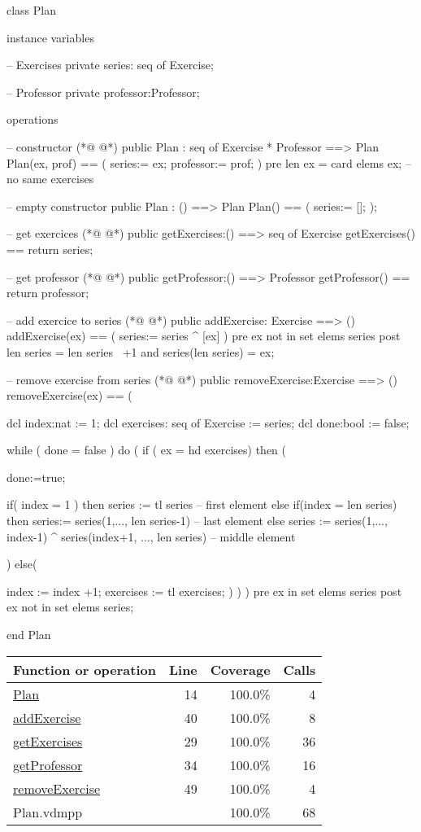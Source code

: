 \begin{vdmpp}[breaklines=true]
class Plan

instance variables
 
 -- Exercises
 private series: seq of Exercise;
 
 -- Professor
 private professor:Professor;
 
operations
 
 -- constructor
(*@
\label{Plan:14}
@*)
 public Plan : seq of Exercise * Professor ==> Plan
 Plan(ex, prof) == (
  series:= ex;
  professor:= prof;
 )
 pre len ex = card elems ex; --no same exercises
 
 
 -- empty constructor
 public Plan : () ==> Plan
 Plan() == (
  series:= [];
 );
 
 -- get exercices
(*@
\label{getExercises:29}
@*)
 public getExercises:() ==> seq of Exercise
 getExercises()  ==
  return series;
  
 -- get professor
(*@
\label{getProfessor:34}
@*)
 public getProfessor:() ==> Professor
 getProfessor()  ==
  return professor;
  
  
 -- add exercice to series
(*@
\label{addExercise:40}
@*)
 public addExercise: Exercise ==> ()
 addExercise(ex) == (
   series:= series ^ [ex]
 )
 pre ex not in set elems series
 post len series = len series~ +1 and series(len series) = ex;
 
 
 -- remove exercise from series
(*@
\label{removeExercise:49}
@*)
 public removeExercise:Exercise ==> ()
 removeExercise(ex) == (
 
   dcl index:nat := 1;
   dcl exercises: seq of Exercise := series;
   dcl done:bool := false;
   
   while ( done = false ) do (
    if ( ex = hd exercises) then (
    
    done:=true;
    
    if( index = 1 ) then  series := tl series                 -- first element
    else if(index = len series) then series:= series(1,..., len series-1)   -- last element
    else series := series(1,..., index-1) ^ series(index+1, ..., len series)  -- middle element
    
   )  else(
   
    index := index +1;
    exercises := tl exercises;
   )
   )
 )
 pre ex in set elems series
 post ex not in set elems series;
 
end Plan
\end{vdmpp}
\bigskip
\begin{longtable}{|l|r|r|r|}
\hline
Function or operation & Line & Coverage & Calls \\
\hline
\hline
\hyperref[Plan:14]{Plan} & 14&100.0\% & 4 \\
\hline
\hyperref[addExercise:40]{addExercise} & 40&100.0\% & 8 \\
\hline
\hyperref[getExercises:29]{getExercises} & 29&100.0\% & 36 \\
\hline
\hyperref[getProfessor:34]{getProfessor} & 34&100.0\% & 16 \\
\hline
\hyperref[removeExercise:49]{removeExercise} & 49&100.0\% & 4 \\
\hline
\hline
Plan.vdmpp & & 100.0\% & 68 \\
\hline
\end{longtable}

